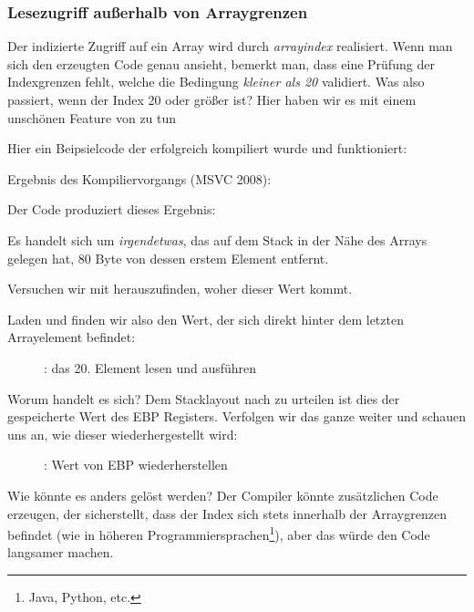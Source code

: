 \subsubsection{Lesezugriff außerhalb von Arraygrenzen}
Der indizierte Zugriff auf ein Array wird durch \emph{array\lbrack{}index\rbrack} realisiert.
Wenn man sich den erzeugten Code genau ansieht, bemerkt man, dass eine Prüfung der Indexgrenzen fehlt, welche die
Bedingung \emph{kleiner als 20} validiert.
Was also passiert, wenn der Index 20 oder größer ist? 
Hier haben wir es mit einem unschönen Feature von \CCpp zu tun

Hier ein Beipsielcode der erfolgreich kompiliert wurde und funktioniert:



Ergebnis des Kompiliervorgangs (MSVC 2008):



Der Code produziert dieses Ergebnis:


Es handelt sich um \emph{irgendetwas}, das auf dem Stack in der Nähe des Arrays gelegen hat, 80 Byte von dessen erstem
Element entfernt.

\clearpage
\myindex{\olly}
Versuchen wir mit \olly herauszufinden, woher dieser Wert kommt.

Laden und finden wir also den Wert, der sich direkt hinter dem letzten Arrayelement befindet:

\begin{figure}[H]
\centering
{}
\caption{\olly: das 20. Element lesen und \printf ausführen}
\label{fig:array_BO_olly_r1}
\end{figure}

Worum handelt es sich? 
Dem Stacklayout nach zu urteilen ist dies der gespeicherte Wert des EBP Registers.
\clearpage
Verfolgen wir das ganze weiter und schauen uns an, wie dieser wiederhergestellt wird:

\begin{figure}[H]
\centering
{}
\caption{\olly: Wert von EBP wiederherstellen}
\label{fig:array_BO_olly_r2}
\end{figure}
Wie könnte es anders gelöst werden?
Der Compiler könnte zusätzlichen Code erzeugen, der sicherstellt, dass der Index sich stets innerhalb der Arraygrenzen
befindet (wie in höheren Programmiersprachen\footnote{Java, Python, etc.}), aber das würde den Code langsamer machen.
